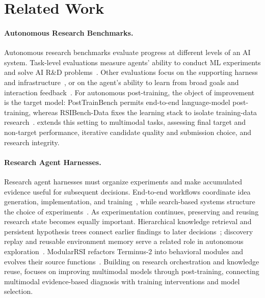 \section{Related Work}
\label{sec:related}

\paragraph{Autonomous Research Benchmarks.}
Autonomous research benchmarks evaluate progress at different levels of an AI system. Task-level evaluations measure agents' ability to conduct ML experiments and solve AI R\&D problems~\citep{mlagentbench,mlebench,rebench}. Other evaluations focus on the supporting harness and infrastructure~\citep{harnessdev,phibench}, or on the agent's ability to learn from broad goals and interaction feedback~\citep{aspire,s3gym}. For autonomous post-training, the object of improvement is the target model: PostTrainBench permits end-to-end language-model post-training, whereas RSIBench-Data fixes the learning stack to isolate training-data research~\citep{posttrainbench,rsibenchdata}. \benchmark{} extends this setting to multimodal tasks, assessing final target and non-target performance, iterative candidate quality and submission choice, and research integrity.

%

\paragraph{Research Agent Harnesses.}
Research agent harnesses must organize experiments and make accumulated evidence useful for subsequent decisions. End-to-end workflows coordinate idea generation, implementation, and training~\citep{aiscientist,aibuildai}, while search-based systems structure the choice of experiments~\citep{aide}. As experimentation continues, preserving and reusing research state becomes equally important. Hierarchical knowledge retrieval and persistent hypothesis trees connect earlier findings to later decisions~\citep{aibuildai2,arbor}; discovery replay and reusable environment memory serve a related role in autonomous exploration~\citep{dreamrsi,rsiagent}. ModularRSI refactors Terminus-2 into behavioral modules and evolves their source functions~\citep{wu2026modularrsi}. Building on research orchestration and knowledge reuse, \harness{} focuses on improving multimodal models through post-training, connecting multimodal evidence-based diagnosis with training interventions and model selection.
